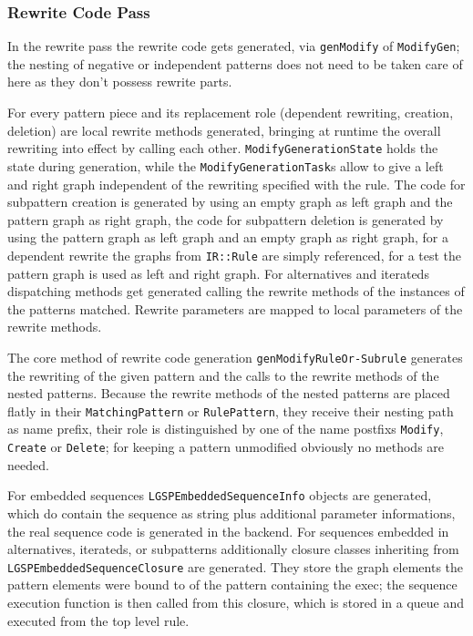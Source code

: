 \subsubsection*{Rewrite Code Pass}
In the rewrite pass the rewrite code gets generated, via \texttt{gen\-Modify} of \texttt{Modify\-Gen};
the nesting of negative or independent patterns does not need to be taken care of here as they don't possess rewrite parts.

For every pattern piece and its replacement role (dependent rewriting, creation, deletion) are local rewrite methods generated, bringing at runtime the overall rewriting into effect by calling each other.
\texttt{Modify\-Generation\-State} holds the state during generation, while the \texttt{Modify\-Generation\-Task}s allow to give a left and right graph independent of the rewriting specified with the rule. The code for subpattern creation is generated by using an empty graph as left graph and the pattern graph as right graph, the code for subpattern deletion is generated by using the pattern graph as left graph and an empty graph as right graph, for a dependent rewrite the graphs from \texttt{IR::Rule} are simply referenced, for a test the pattern graph is used as left and right graph.
For alternatives and iterateds dispatching methods get generated calling the rewrite methods of the instances of the patterns matched.
Rewrite parameters are mapped to local parameters of the rewrite methods.

The core method of rewrite code generation \texttt{gen\-Modify\-Rule\-Or-Subrule} generates the rewriting of the given pattern and the calls to the rewrite methods of the nested patterns.
Because the rewrite methods of the nested patterns are placed flatly in their \texttt{Matching\-Pattern} or \texttt{Rule\-Pattern}, they receive their nesting path as name prefix, their role is distinguished by one of the name postfixs \texttt{Modify}, \texttt{Create} or \texttt{Delete}; for keeping a pattern unmodified obviously no methods are needed.

For embedded sequences \texttt{LGSPEmbeddedSequenceInfo} objects are generated, which do contain the sequence as string plus additional parameter informations, the real sequence code is generated in the backend.
For sequences embedded in alternatives, iterateds, or subpatterns additionally closure classes inheriting from \texttt{LGSPEmbeddedSequenceClosure} are generated.
They store the graph elements the pattern elements were bound to of the pattern containing the exec; the sequence execution function is then called from this closure, which is stored in a queue and executed from the top level rule.


